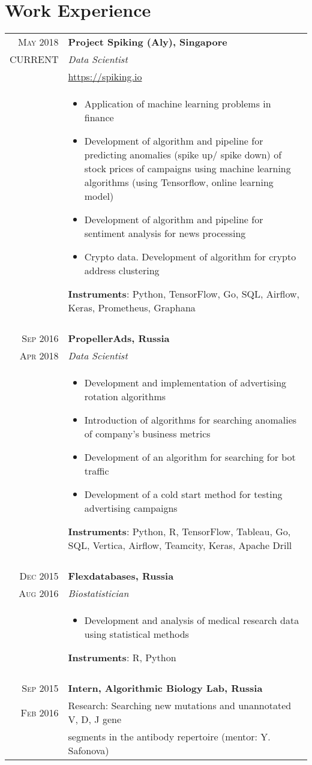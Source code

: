 \documentclass[a4paper,10pt]{article}
\begin{document}
\section{Work Experience}
\begin{tabular}{r|p{11cm}}
\textsc{May 2018} &\textbf{Project Spiking (Aly), Singapore} \\
  \textsc{CURRENT}&\emph{Data Scientist}\\
  {}&\href{https://spiking.io/}{https://spiking.io}\\
  {}&\begin{itemize}  
\item Application of machine learning problems in finance
\item Development of algorithm and pipeline for predicting anomalies (spike up/ spike down) of stock prices of campaigns using machine learning algorithms (using Tensorflow, online learning model)
\item Development of algorithm and pipeline for sentiment analysis for news processing
\item Crypto data. Development of algorithm for crypto address clustering
\end{itemize}
\textbf{Instruments}: Python, TensorFlow, Go, SQL, Airflow, Keras, Prometheus, Graphana  \\
& \\
\textsc{Sep 2016} & \textbf{PropellerAds, Russia} \\\textsc{Apr 2018}&\emph{Data Scientist}\\
{}&\begin{itemize}  
\item Development and implementation of advertising rotation algorithms
\item Introduction of algorithms for searching anomalies of company's business metrics
\item Development of an algorithm for searching for bot traffic
\item Development of a cold start method for testing advertising campaigns
\end{itemize}
\textbf{Instruments}: Python, R, TensorFlow,  Tableau, Go, SQL, Vertica, Airflow, Teamcity, Keras, Apache Drill   \\
& \\
 \textsc{Dec 2015} & \textbf{Flexdatabases, Russia} \\\textsc{Aug 2016}&\emph{Biostatistician}\\
 {}&\begin{itemize}  
 \item Development and analysis of medical research data using statistical methods
 \end{itemize}
 \textbf{Instruments}: R, Python\\
 & \\
 \textsc{Sep 2015} & \textbf{Intern, Algorithmic Biology Lab, Russia} \\
 \textsc{Feb 2016} & Research: Searching new mutations and unannotated V, D, J gene\\& segments in the antibody repertoire (mentor: Y. Safonova)
 
 
 \multicolumn{2}{c}{} \\
\end{tabular}
\end{document}

